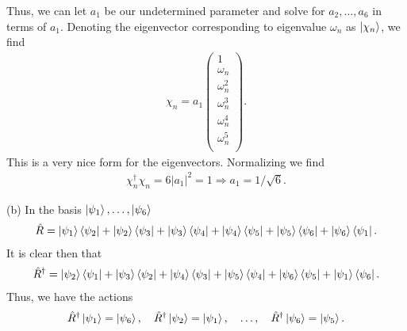 {Thus, we can let $a_1$ be our undetermined parameter and solve for $a_2,\ldots,a_6$ in terms of $a_1$.
Denoting the eigenvector corresponding to eigenvalue $\omega_{n}$ as $\ket{\chi_{n}}$, we find
\begin{eqnarray}
    \chi_{n} = a_1 \begin{pmatrix}
        1\\
        \omega_{n} \\
        \omega_{n}^2 \\
        \omega_{n}^3 \\
        \omega_{n}^{4} \\
        \omega_{n}^{5} \\
    \end{pmatrix}    
.\end{eqnarray}
This is a very nice form for the eigenvectors.
Normalizing we find
\begin{eqnarray}
    \chi_{n}^{\dagger}\chi_{n} = 6 |a_1|^2 = 1 \Rightarrow a_1 = 1/\sqrt{6}
.\end{eqnarray}

(b) In the basis $\ket{\psi_1},\ldots,\ket{\psi_6}$
\begin{eqnarray}
    \hat{R} = \ket{\psi_1}\bra{\psi_2} + \ket{\psi_2}\bra{\psi_3} + \ket{\psi_3}\bra{\psi_4} + \ket{\psi_4}\bra{\psi_5} + \ket{\psi_5}\bra{\psi_6} + \ket{\psi_6}\bra{\psi_1} 
.\end{eqnarray}
It is clear then that
\begin{eqnarray}
    \hat{R}^{\dagger} = \ket{\psi_2}\bra{\psi_1} + \ket{\psi_3}\bra{\psi_2} + \ket{\psi_4}\bra{\psi_3} + \ket{\psi_5}\bra{\psi_4} + \ket{\psi_6}\bra{\psi_5} + \ket{\psi_1}\bra{\psi_6} 
.\end{eqnarray}
Thus, we have the actions
\begin{eqnarray}
    \hat{R}^{\dagger} \ket{\psi_1} = \ket{\psi_6}, \quad \hat{R}^{\dagger} \ket{\psi_2} = \ket{\psi_1}, \quad \ldots, \quad \hat{R}^{\dagger} \ket{\psi_6} = \ket{\psi_5}
.\end{eqnarray}

}
